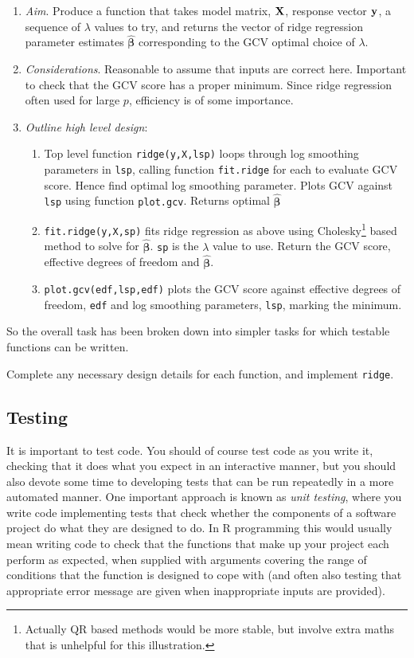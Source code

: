 \documentclass[10pt] {article}
\newcommand{\bp}{{\vm \beta}}
\newcommand{\vm}{\bm} %
\theoremstyle{definition}
\begin{document}
\begin{enumerate}
\item {\em Aim}. Produce a function that takes model matrix, $\bf X$, response vector $\bf y$, a sequence of $\lambda $ values to try, and returns the vector of ridge regression parameter estimates $\hat \bp$ corresponding to the GCV optimal choice of $\lambda$.
\item {\em Considerations}. Reasonable to assume that inputs are correct here. Important to check that the GCV score has a proper minimum. Since ridge regression often used for large $p$, efficiency is of some importance.
\item {\em Outline high level design}: \begin{enumerate}
\item Top level function {\tt ridge(y,X,lsp)} loops through log smoothing parameters in {\tt lsp}, calling function {\tt fit.ridge} for each to evaluate GCV score. Hence find optimal log smoothing parameter. Plots GCV against {\tt lsp} using function {\tt plot.gcv}. Returns optimal $\hat \bp$
\item {\tt fit.ridge(y,X,sp)} fits ridge regression as above using Cholesky\footnote{Actually QR based methods would be more stable, but involve extra maths that is unhelpful for this illustration.} based method to solve for $\hat \bp$. {\tt sp} is the $\lambda $ value to use. Return the GCV score, effective degrees of freedom and $\hat \bp$.
\item {\tt plot.gcv(edf,lsp,edf)} plots the GCV score against effective degrees of freedom, {\tt edf} and log smoothing parameters, {\tt lsp}, marking the minimum.
\end{enumerate}
\end{enumerate}   
So the overall task has been broken down into simpler tasks for which testable functions can be written. 

\bigskip

 Complete any necessary design details for each function, and implement {\tt ridge}. 

\subsection{Testing}

It is important to test code. You should of course test code as you write it, checking that it does what you expect in an interactive manner, but you should also devote some time to developing tests that can be run repeatedly in a more automated manner. One important approach is known as {\em unit testing}, where you write code implementing tests that check whether the components of a software project do what they are designed to do. In R programming this would usually mean writing code to check that the functions that make up your project each perform as expected, when supplied with arguments covering the range of conditions that the function is designed to cope with (and often also testing that appropriate error message are given when inappropriate inputs are provided). 
\end{document}
